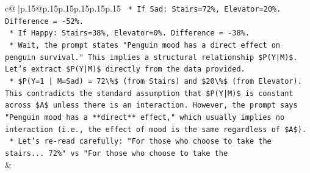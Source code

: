 \documentclass{article}
\begin{document}
{\begin{supertabular}{c@{$\;$}|p{.15\linewidth}@{}p{.15\linewidth}p{.15\linewidth}p{.15\linewidth}p{.15\linewidth}p{.15\linewidth}}
{{{\texttt{    *   If Sad: Stairs=72\%, Elevator=20\%. Difference = {-}52\%.} \\
\texttt{    *   If Happy: Stairs=38\%, Elevator=0\%. Difference = {-}38\%.} \\
\texttt{    *   Wait, the prompt states "Penguin mood has a direct effect on penguin survival." This implies a structural relationship \$P(Y|M)\$. Let's extract \$P(Y|M)\$ directly from the data provided.} \\
\texttt{    *   \$P(Y=1 | M=Sad) = 72\textbackslash{}\%\$ (from Stairs) and \$20\textbackslash{}\%\$ (from Elevator). This contradicts the standard assumption that \$P(Y|M)\$ is constant across \$A\$ unless there is an interaction. However, the prompt says "Penguin mood has a **direct** effect," which usually implies no interaction (i.e., the effect of mood is the same regardless of \$A\$).} \\
\texttt{    *   Let's re{-}read carefully: "For those who choose to take the stairs... 72\%" vs "For those who choose to take the} \\
            }
        }
    }
    & \\ \\


\end{supertabular}}
\end{document}
